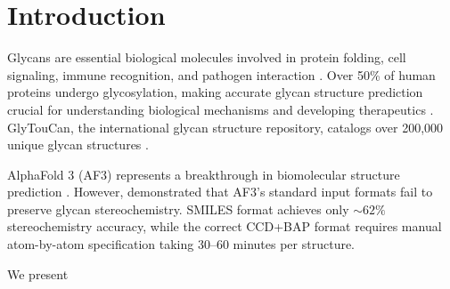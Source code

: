 \documentclass[11pt,a4paper]{article}
\begin{document}
\linenumbers

\section{Introduction}

Glycans are essential biological molecules involved in protein folding, cell signaling, immune recognition, and pathogen interaction \citep{varki2017}. Over 50\% of human proteins undergo glycosylation, making accurate glycan structure prediction crucial for understanding biological mechanisms and developing therapeutics \citep{helenius2004}. GlyTouCan, the international glycan structure repository, catalogs over 200,000 unique glycan structures \citep{tiemeyer2016}.

AlphaFold 3 (AF3) represents a breakthrough in biomolecular structure prediction \citep{abramson2024}. However, \citet{huang2025} demonstrated that AF3's standard input formats fail to preserve glycan stereochemistry. SMILES format achieves only ${\sim}62\%$ stereochemistry accuracy, while the correct CCD+BAP format requires manual atom-by-atom specification taking 30--60 minutes per structure.

We present
\end{document}
